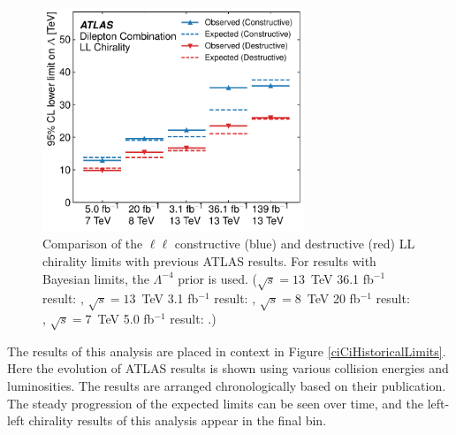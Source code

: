 \begin{figure}[h!]
\centering
\includegraphics[width=0.70\textwidth]{figures/ci/results/figaux_05.pdf}
\caption{Comparison of the $\ell\ell$ constructive (blue) and destructive (red) LL chirality limits with previous ATLAS results. For results with Bayesian limits, the $\Lambda^{-4}$ prior is used. ($\sqrt{s}=13$~TeV 36.1 fb$^{-1}$ result: \cite{EXOT-2016-05}, $\sqrt{s}=13$~TeV 3.1 fb$^{-1}$ result: \cite{EXOT-2015-07}, $\sqrt{s}=8$~TeV 20 fb$^{-1}$ result: \cite{EXOT-2013-19}, $\sqrt{s}=7$~TeV 5.0 fb$^{-1}$ result: \cite{EXOT-2012-17}.)}
\label{fig:ciCiHistoricalLimits}
\end{figure}

The results of this analysis are placed in context in Figure \ref{ciCiHistoricalLimits}.
Here the evolution of ATLAS results is shown using various collision energies and luminosities.
The results are arranged chronologically based on their publication.
The steady progression of the expected limits can be seen over time, and the left-left chirality results of this analysis appear in the final bin.


